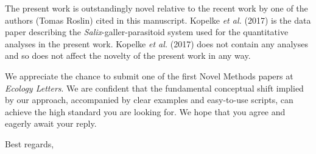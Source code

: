 \documentclass[12pt]{letter}
\begin{document}
\begin{letter}
    The present work is outstandingly novel relative to the recent work by one of the authors (Tomas Roslin) cited in this manuscript. Kopelke \emph{et al.} (2017) is the data paper describing the \emph{Salix}-galler-parasitoid system used for the quantitative analyses in the present work. Kopelke \emph{et al.} (2017) does not contain any analyses and so does not affect the novelty of the present work in any way.


    We appreciate the chance to submit one of the first Novel Methods papers at \emph{Ecology Letters}. We are confident that the fundamental conceptual shift implied by our approach, accompanied by clear examples and easy-to-use scripts, can achieve the high standard you are looking for. We hope that you agree and eagerly await your reply.


\closing{Best regards,}


\end{letter}
\end{document}
